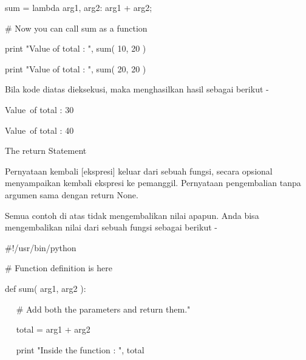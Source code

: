 \noindent 
 \hspace*{0.5in} sum = lambda arg1, arg2: arg1 + arg2; \par
\vspace{12pt}
\noindent 
  \par
\vspace{12pt}
\noindent 
 \hspace*{0.5in}  $  \#  $ Now you can call sum as a function \par
\noindent 
 \hspace*{0.5in} print "Value of total : ", sum( 10, 20 ) \par
\noindent 
 \hspace*{0.5in} print "Value of total : ", sum( 20, 20 ) \par
\noindent 
Bila kode diatas dieksekusi, maka menghasilkan hasil sebagai berikut - \par
\noindent 
 \hspace*{0.5in} Value~of total :  30 \par
\noindent 
 \hspace*{0.5in} Value~of total :  40 \par
\vspace{12pt}
\noindent 
The $  $return $  $Statement \par
\noindent 
Pernyataan kembali [ekspresi] keluar dari sebuah fungsi, secara opsional menyampaikan kembali ekspresi ke pemanggil. Pernyataan pengembalian tanpa argumen sama dengan return None. \par
\noindent 
Semua contoh di atas tidak mengembalikan nilai apapun. Anda bisa mengembalikan nilai dari sebuah fungsi sebagai berikut - \par
\noindent 
 \hspace*{0.5in}  $  \#  $!/usr/bin/python \par
\vspace{12pt}
\noindent 
 \hspace*{0.5in}  $  \#  $ Function definition is here \par
\noindent 
 \hspace*{0.5in} def sum( arg1, arg2 ): \par
\noindent 
 \hspace*{0.5in} ~~  $  \#  $ Add both the parameters and return them." \par
\noindent 
 \hspace*{0.5in} ~~ total = arg1 + arg2 \par
\noindent 
 \hspace*{0.5in} ~~ print "Inside the function : ", total \par
